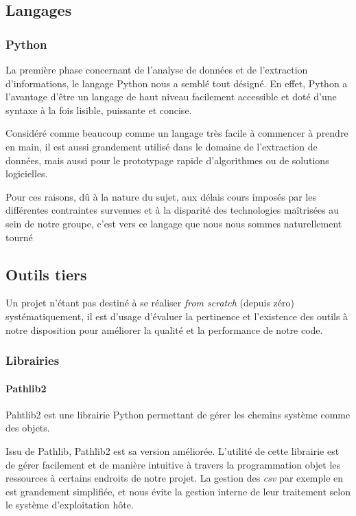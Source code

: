 \documentclass{article}
\begin{document}
\subsection{Langages}

\subsubsection{Python}

La première phase concernant de l'analyse de données et de l'extraction d'informations, le langage Python nous a semblé tout désigné.
En effet, Python a l'avantage d'être un langage de haut niveau facilement accessible et doté d'une syntaxe à la fois lisible, puissante et concise.

Considéré comme beaucoup comme un langage très facile à commencer à prendre en main, il est aussi grandement utilisé dans le domaine de l'extraction de données, mais aussi pour le prototypage rapide d'algorithmes ou de solutions logicielles.

Pour ces raisons, dû à la nature du sujet, aux délais cours imposés par les différentes contraintes survenues et à la disparité des technologies maîtrisées au sein de notre groupe, c'est vers ce langage que nous nous sommes naturellement tourné

\subsection{Outils tiers}

Un projet n'étant pas destiné à se réaliser \textit{from scratch} (depuis zéro) systématiquement, il est d'usage d'évaluer la pertinence et l'existence des outils à notre disposition pour améliorer la qualité et la performance de notre code.

\subsubsection{Librairies}

\paragraph{Pathlib2}

Pahtlib2 est une librairie Python permettant de gérer les chemins système comme des objets.

Issu de Pathlib, Pathlib2 est sa version améliorée.
L'utilité de cette librairie est de gérer facilement et de manière intuitive à travers la programmation objet les ressources à certains endroits de notre projet.
La gestion des \textit{csv} par exemple en est grandement simplifiée, et nous évite la gestion interne de leur traitement selon le système d'exploitation hôte.
\end{document}
